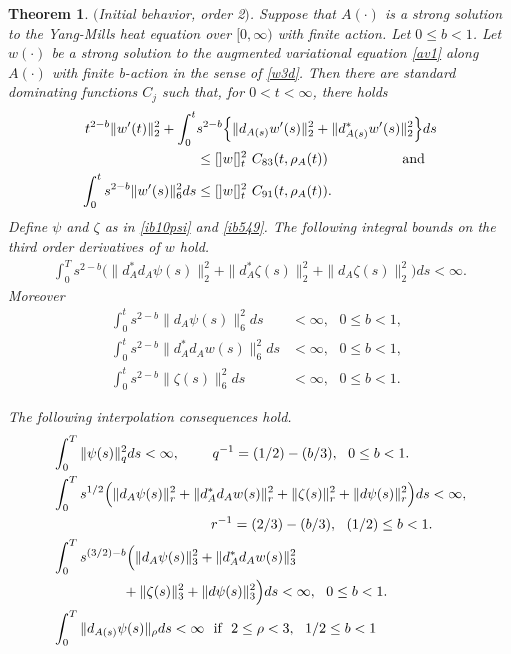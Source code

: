 \documentclass[12pt]{article}
\newtheorem{theorem}{Theorem}[section]
\def \({\Big(}
\def \){\Big)}
\def \nn{[]}
\def \eref{\eqref}
\numberwithin{equation}{section}
\begin{document}
        \begin{theorem}\label{ibord2b} $($Initial behavior, order 2$)$. 
 Suppose that $A(\cdot)$ is 
a strong solution to the Yang-Mills heat equation over $[0, \infty)$ with  
 finite action. Let $0 \le b <1$.
Let $w(\cdot)$ be a strong solution to the augmented variational equation \eref{av1} along
$A(\cdot)$ with finite b-action in the sense  of \eref{w3d}.  
Then there are standard dominating functions $C_j$ such that, for  $0 < t < \infty$, 
there holds
     \begin{align}
t^{2-b} \| w'(t)\|_2^2 
+\int_0^t &s^{2-b} \Big\{\|d_{A(s)} w'(s) \|_2^2  + \|d_{A(s)}^* w'(s) \|_2^2  \Big\}ds   \label{ib540b} \\  
              & \le  \nn w\nn_t^2\ C_{83}(t, \rho_A(t))      \ \ \ \ \qquad\qquad \text{and}                \notag\\           
\int_0^t s^{2-b} \| w'(s)\|_6^2 ds &\le  \nn w\nn_t^2\ C_{91}(t, \rho_A(t)).      \label{ib542b}
\end{align}
Define $\psi$ and $\zeta$ as in \eref{ib10psi} and \eref{ib549}.
The following integral bounds on the third order derivatives of $w$ hold.
        \begin{align}
\int_0^T s^{2-b}\( \|d_A^*d_A\psi(s)\|_2^2     
+ \|d_A^*\zeta(s)\|_2^2 + \|d_A\zeta(s)\|_2^2 \)ds < \infty.        \label{ib542c}
\end{align}
Moreover 
\begin{align}
\int_0^t s^{2-b}  \|d_A \psi(s)\|_6^2  ds  &< \infty, \ \ \ 0\le b <1, \ \   \label{ib543} \\
\int_0^t s^{2-b}  \| d_A^* d_A w(s)\|_6^2ds &< \infty, \ \ \ 0 \le b <1,   \label{ib545}       \\
\int_0^t s^{2-b} \|\zeta(s)\|_6^2 ds &< \infty, \ \ \  0 \le b <1.                  \label{ib545z}                         
\end{align}

 
 The following interpolation consequences hold. 
\begin{align} 
&\int_0^T \|\psi(s)\|_q^2 ds < \infty,  
           \ \ \ \ \ \ \ q^{-1} = (1/2) - (b/3),\ \ 0 \le b < 1.                     \label{ib546}\\
&\int_0^T s^{1/2} \Big(\| d_A \psi(s)\|_r^2  +  \| d_A^* d_A w(s)\|_r^2  
+ \|\zeta(s)\|_r^2 + \|d\psi(s)\|_r^2\Big) ds < \infty, \label{ib547}\\
 &\qquad\qquad\qquad \qquad \qquad\ \ \ \ r^{-1} = (2/3) - (b/3), \ \ (1/2) \le b < 1. \notag \\
 &\int_0^T s^{(3/2) -b}\( \| d_{A} \psi(s)\|_3^2 + \| d_A^* d_A w(s)\|_3^2  \notag \\
  &\qquad\qquad\ \ \  + \| \zeta(s)\|_3^2 + \|d\psi(s)\|_3^2 \)ds < \infty, \ \ 0 \le b <1.    \label{ib548} \\
  & \int_0^T \|  d_{A(s)} \psi(s)\|_\rho ds < \infty\ \ \text{if}\ \ 2 \le \rho < 3,\ \ 1/2 \le b < 1 \label{ib715}
 \end{align}
 
 \end{theorem}
\end{document}
